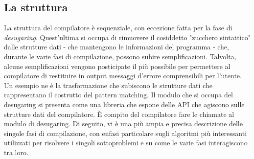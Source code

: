 \documentclass[10pt,a4paper]{article}
\begin{document}
\subsection{La struttura}
\newline

La struttura del compilatore è sequenziale, con eccezione fatta per la fase di \textit{desugaring}. Quest'ultima si
occupa di rimuovere il cosiddetto "zucchero sintattico" dalle strutture dati - che mantengono le informazioni del
programma - che, durante le varie fasi di compilazione, possono subire semplificazioni. Talvolta, alcune semplificazioni
vengono posticipate il più possibile per permettere al compilatore di restituire in output messaggi d'errore comprensibili
per l'utente. Un esempio ne è la trasformazione che subiscono le strutture dati che rappresentano il costrutto del
pattern matching. Il modulo che si occupa del desugaring si presenta come una libreria che espone delle API che agiscono
sulle strutture dati del compilatore. \`E compito del compilatore fare le chiamate al modulo di desugaring. Di seguito,
vi è una più ampia e precisa descrizione delle singole fasi di compilazione, con enfasi particolare sugli algoritmi
più interessanti utilizzati per risolvere i singoli sottoproblemi e su come le varie fasi interagiscono tra loro.
\end{document}
